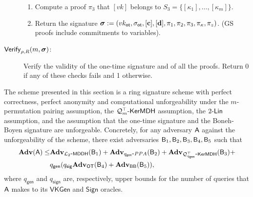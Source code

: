 \begin{description}
\begin{enumerate}
\item Compute a proof $\pi_3$ that $[vk]$ belongs to $S_3=\{[\kappa_1],\ldots,[\kappa_m]\}$.
\item Return the signature ${\boldsymbol \sigma}:=(vk_\mathsf{ot},\sigma_\mathsf{ot},[\mathbf{c}],[\mathbf{d}],\pi_1,\pi_2,\pi_3,\pi_\kappa,\pi_z)$. (GS proofs include commitments to variables).
\end{enumerate}
\item[$\mathsf{Verify}_{\rho,R}(m,{\boldsymbol \sigma})$:] Verify the validity of the one-time signature and of all the proofs. Return 0 if any of these checks fails and 1 otherwise.
\end{description}

\begin{theorem}
The scheme presented in this section is a ring signature scheme
with perfect correctness, perfect anonymity and computational unforgeability under the
$m$-permutation pairing assumption, the $\mathcal{Q}_m^\top\mbox{-}\mathsf{KerMDH}$ assumption, the $2\mbox{-}\mathsf{Lin}$ assumption, and the assumption
that the one-time signature and the Boneh-Boyen signature are unforgeable.
Concretely, for any adversary $\mathsf{A}$ against the unforgeability of the scheme, there exist adversaries $\mathsf{B}_1,\mathsf{B}_2,\mathsf{B}_3,\mathsf{B}_4,\mathsf{B}_5$ such that
\begin{align*}
\mathbf{Adv}(\mathsf{A})\leq &\mathbf{Adv}_{\mathcal{L}_2\mbox{-}\mathsf{MDDH}}(\mathsf{B}_1)+\mathbf{Adv}_{q_\mathsf{gen}\mbox{-}PPA}(\mathsf{B}_2)+\mathbf{Adv}_{\mathcal{Q}^\top_{q_\mathsf{gen}}\mbox{-}\mathsf{KerMDH}}(\mathsf{B}_3)+\\
&q_\mathsf{gen}(q_\mathsf{sig}\mathbf{Adv}_{\mathsf{OT}}(\mathsf{B}_4)+\mathbf{Adv}_{\mathsf{BB}}(\mathsf{B}_5)),
\end{align*}
where $q_\mathsf{gen}$ and $q_\mathsf{sign}$ are, respectively, upper bounds for the number of queries that $\mathsf{A}$ makes to its $\mathsf{VKGen}$ and $\mathsf{Sign}$ oracles.
\end{theorem}
